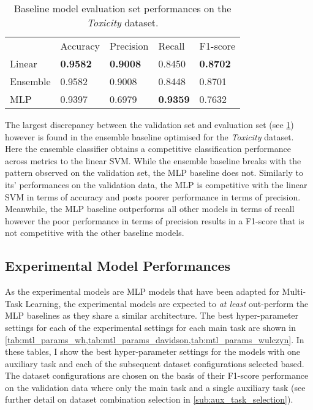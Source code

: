 \begin{table}[h]
  \centering
  \begin{tabular}{lllll}
                          & Accuracy        & Precision       & Recall          & F1-score        \\
    Linear                & \textbf{0.9582} & \textbf{0.9008} & 0.8450          & \textbf{0.8702} \\
    Ensemble\footnotemark & 0.9582          & 0.9008          & 0.8448          & 0.8701          \\
    MLP                   & 0.9397          & 0.6979          & \textbf{0.9359} & 0.7632
  \end{tabular}
  \caption{Baseline model evaluation set performances on the \textit{Toxicity} dataset.}
  \label{tab:baseline_test_wulczyn}
\end{table}

The largest discrepancy between the validation set and evaluation set (see \cref{tab:baseline_test_wulczyn}) however is found in the ensemble baseline optimised for the \textit{Toxicity} dataset.
Here the ensemble classifier obtains a competitive classification performance across metrics to the linear SVM.
While the ensemble baseline breaks with the pattern observed on the validation set, the MLP baseline does not.
Similarly to its' performances on the validation data, the MLP is competitive with the linear SVM in terms of accuracy and posts poorer performance in terms of precision.
Meanwhile, the MLP baseline outperforms all other models in terms of recall however the poor performance in terms of precision results in a F1-score that is not competitive with the other baseline models.

\subsection{Experimental Model Performances}
As the experimental models are MLP models that have been adapted for Multi-Task Learning, the experimental models are expected to \textit{at least} out-perform the MLP baselines as they share a similar architecture.
The best hyper-parameter settings for each of the experimental settings for each main task are shown in \cref{tab:mtl_params_wh,tab:mtl_params_davidson,tab:mtl_params_wulczyn}.
In these tables, I show the best hyper-parameter settings for the models with one auxiliary task and each of the subsequent dataset configurations selected based.
The dataset configurations are chosen on the basis of their F1-score performance on the validation data where only the main task and a single auxiliary task (see further detail on dataset combination selection in \cref{sub:aux_task_selection}).

